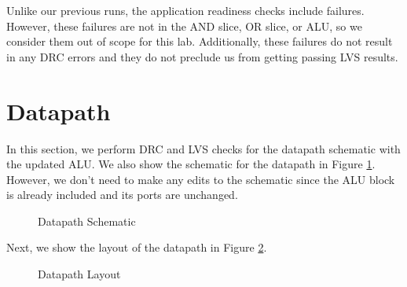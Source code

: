 \documentclass{article}
\begin{document}
	\noindent Unlike our previous runs, the application readiness checks include failures. However, these failures are not in the AND slice, OR slice, or ALU, so we consider them out of scope for this lab. Additionally, these failures do not result in any DRC errors and they do not preclude us from getting passing LVS results.
	
	\section{Datapath}
	
	In this section, we perform DRC and LVS checks for the datapath schematic with the updated ALU. We also show the schematic for the datapath in Figure \ref{fig::datapath_schematic}. However, we don't need to make any edits to the schematic since the ALU block is already included and its ports are unchanged.
	
	\begin{figure}[H]
		\centerline{}
		\caption{Datapath Schematic}
		\label{fig::datapath_schematic}
	\end{figure}
	
	\noindent Next, we show the layout of the datapath in Figure \ref{fig::datapath_layout}.
	
	\begin{figure}[H]
		\centerline{}
		\caption{Datapath Layout}
		\label{fig::datapath_layout}
	\end{figure}
	
\end{document}
